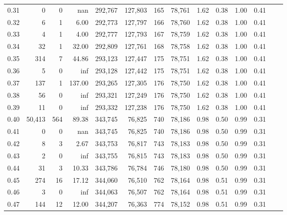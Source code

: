 \begin{tabular}{rrrrrrrrrrrrrr}
0.31 &       0 &       0 &       nan &  292,767 &  127,803 &     165 &  78,761 &  1.62 &  0.38 &  1.00 &      0.41 \\
0.32 &       6 &       1 &      6.00 &  292,773 &  127,797 &     166 &  78,760 &  1.62 &  0.38 &  1.00 &      0.41 \\
0.33 &       4 &       1 &      4.00 &  292,777 &  127,793 &     167 &  78,759 &  1.62 &  0.38 &  1.00 &      0.41 \\
0.34 &      32 &       1 &     32.00 &  292,809 &  127,761 &     168 &  78,758 &  1.62 &  0.38 &  1.00 &      0.41 \\
0.35 &     314 &       7 &     44.86 &  293,123 &  127,447 &     175 &  78,751 &  1.62 &  0.38 &  1.00 &      0.41 \\
0.36 &       5 &       0 &       inf &  293,128 &  127,442 &     175 &  78,751 &  1.62 &  0.38 &  1.00 &      0.41 \\
0.37 &     137 &       1 &    137.00 &  293,265 &  127,305 &     176 &  78,750 &  1.62 &  0.38 &  1.00 &      0.41 \\
0.38 &      56 &       0 &       inf &  293,321 &  127,249 &     176 &  78,750 &  1.62 &  0.38 &  1.00 &      0.41 \\
0.39 &      11 &       0 &       inf &  293,332 &  127,238 &     176 &  78,750 &  1.62 &  0.38 &  1.00 &      0.41 \\
0.40 &  50,413 &     564 &     89.38 &  343,745 &   76,825 &     740 &  78,186 &  0.98 &  0.50 &  0.99 &      0.31 \\
0.41 &       0 &       0 &       nan &  343,745 &   76,825 &     740 &  78,186 &  0.98 &  0.50 &  0.99 &      0.31 \\
0.42 &       8 &       3 &      2.67 &  343,753 &   76,817 &     743 &  78,183 &  0.98 &  0.50 &  0.99 &      0.31 \\
0.43 &       2 &       0 &       inf &  343,755 &   76,815 &     743 &  78,183 &  0.98 &  0.50 &  0.99 &      0.31 \\
0.44 &      31 &       3 &     10.33 &  343,786 &   76,784 &     746 &  78,180 &  0.98 &  0.50 &  0.99 &      0.31 \\
0.45 &     274 &      16 &     17.12 &  344,060 &   76,510 &     762 &  78,164 &  0.98 &  0.51 &  0.99 &      0.31 \\
0.46 &       3 &       0 &       inf &  344,063 &   76,507 &     762 &  78,164 &  0.98 &  0.51 &  0.99 &      0.31 \\
0.47 &     144 &      12 &     12.00 &  344,207 &   76,363 &     774 &  78,152 &  0.98 &  0.51 &  0.99 &      0.31 \\

\end{tabular}
